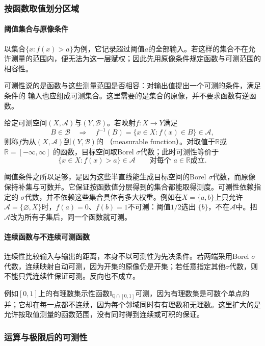 \subsubsection{按函数取值划分区域}
\paragraph{阈值集合与原像条件}

以集合$\{x:f(x)>a\}$为例，它记录超过阈值$a$的全部输入。若这样的集合不在允许测量的范围内，便无法为这一层赋权；因此先用原像条件规定函数与可测范围的相容性。

可测性说的是函数与这些测量范围是否相容：对输出值提出一个可测的条件，满足条件的
输入也应组成可测集合。这里需要的是集合的原像，并不要求函数有逆函数。
\begin{definition}[可测函数]
\label{def:analysis-measurable-function}
给定可测空间$(X,\mathcal{A})$与$(Y,\mathcal{B})$。若映射$f:X\to Y$满足
\[
  B\in\mathcal{B}\quad\Longrightarrow\quad
  f^{-1}(B)=\{x\in X:f(x)\in B\}\in\mathcal{A},
\]
则称$f$为从$(X,\mathcal{A})$到$(Y,\mathcal{B})$的
（measurable function）。对取值于$\mathbb{R}$或$\overline{\mathbb{R}}=[-\infty,\infty]$
的函数，目标空间取Borel $\sigma$代数；此时可测性等价于
\[
  \{x\in X:f(x)>a\}\in\mathcal{A}
  \qquad\text{对每个 }a\in\mathbb{R}\text{成立}.
\]
\end{definition}
阈值条件之所以足够，是因为这些半直线能生成目标空间的Borel $\sigma$代数，而原像
保持补集与可数并。它保证按函数值分层得到的集合都能取得测度。可测性依赖指定的
$\sigma$代数，并不依赖这些集合具体有多大权重。例如在$X=\{a,b\}$上只允许
$\mathcal{A}=\{\varnothing,X\}$时，$f(a)=0$、$f(b)=1$不可测：阈值$1/2$选出
$\{b\}$，不在$\mathcal{A}$中。把$\mathcal{A}$改为所有子集后，同一个函数就可测。

\paragraph{连续函数与不连续可测函数}

连续性比较输入与输出的距离，本身不以可测性为先决条件。若两端采用Borel $\sigma$代数，连续映射自动可测，因为开集的原像仍是开集；若任意指定其他$\sigma$代数，则不能只凭连续性保证可测。反向也不成立。

例如$[0,1]$上的有理数集示性函数$\mathbb I_{\mathbb Q\cap[0,1]}$可测，因为有理数集是可数个单点的并；它却在每一点都不连续，因为每个邻域同时有有理数和无理数。这里扩大的是允许按取值测量的函数范围，没有同时得到连续或可积的保证。

\subsubsection{运算与极限后的可测性}
